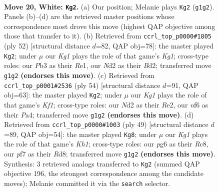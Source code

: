 \documentclass[11pt]{article}
\begin{document}
\clearpage

\begin{figure}[p]\centering
\begin{subfigure}{0.46\textwidth}\centering
\resizebox{\linewidth}{!}{%
\newchessgame
\chessboard[
  setfen={r1bqk1r1/5p2/1p2pnp1/p1b4p/P4B1P/1P1B2P1/2PNQP2/R3R1K1 w q - 7 20},
  showmover=false,
  pgfstyle=straightmove, color=movearrow, markmove={g1-g2}
]}
\caption{}
\end{subfigure}\hfill
\begin{subfigure}{0.46\textwidth}\centering
\resizebox{\linewidth}{!}{%
\newchessgame
\chessboard[
  setfen={4r2k/1p1r1qbp/p1p1pnp1/5p2/P1BP3P/1Q2P1P1/1P1B1P2/R3R1K1 w - - 1 27},
  showmover=false,
  pgfstyle=straightmove, color=movearrow, markmove={g1-g2}
]}
\caption{}
\end{subfigure}
\\[4pt]
\begin{subfigure}{0.46\textwidth}\centering
\resizebox{\linewidth}{!}{%
\newchessgame
\chessboard[
  setfen={2r3kr/1pq2pp1/4p1bn/pBbpP1Np/P4B1P/2P2PP1/1P1QR3/2R2K2 w - - 1 28},
  showmover=false,
  pgfstyle=straightmove, color=movearrow, markmove={f1-g2}
]}
\caption{}
\end{subfigure}\hfill
\begin{subfigure}{0.46\textwidth}\centering
\resizebox{\linewidth}{!}{%
\newchessgame
\chessboard[
  setfen={2rr1q1k/1p1n1pp1/p1bppb1p/P7/1P2P3/1RN2P1P/2PQ1BP1/3R1BK1 b - - 10 25},
  showmover=false,
  pgfstyle=straightmove, color=movearrow, markmove={h8-g8}
]}
\caption{}
\end{subfigure}
\caption{\textbf{Move 20, White: \texttt{Kg2}.} (a) Our position; Melanie plays \texttt{Kg2} (\texttt{g1g2}). Panels (b)--(d) are the retrieved master positions whose correspondence most drove this move (highest QAP objective among those that transfer to it). (b) Retrieved from \texttt{ccrl\_top\_p0000\#1805} (ply 52) [structural distance $d$=82, QAP obj=78]: the master played \texttt{Kg2}; under $\mu$ our \emph{Kg1} plays the role of that game's \emph{Kg1}; cross-type roles: our \emph{P}b3 as their \emph{R}e1, our \emph{N}d2 as their \emph{B}d2; transferred move \texttt{g1g2} \textbf{(endorses this move)}. (c) Retrieved from \texttt{ccrl\_top\_p0001\#2536} (ply 54) [structural distance $d$=91, QAP obj=63]: the master played \texttt{Kg2}; under $\mu$ our \emph{Kg1} plays the role of that game's \emph{Kf1}; cross-type roles: our \emph{N}d2 as their \emph{R}e2, our \emph{n}f6 as their \emph{P}a4; transferred move \texttt{g1g2} \textbf{(endorses this move)}. (d) Retrieved from \texttt{ccrl\_top\_p0000\#1003} (ply 49) [structural distance $d$=89, QAP obj=54]: the master played \texttt{Kg8}; under $\mu$ our \emph{Kg1} plays the role of that game's \emph{Kh1}; cross-type roles: our \emph{p}g6 as their \emph{R}c8, our \emph{p}f7 as their \emph{R}d8; transferred move \texttt{g1g2} \textbf{(endorses this move)}. Synthesis: 3 retrieved analogs transferred to \texttt{Kg2} (summed QAP objective 196, the strongest correspondence among the candidate moves); Melanie committed it via the \texttt{search} selector.}
\label{fig:thought-m38}
\end{figure}
\end{document}

